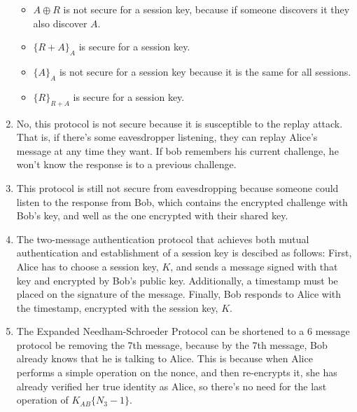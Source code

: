 \documentclass[11pt]{article}
\begin{document}
\begin{enumerate}
\begin{itemize}

\item $A \oplus R$ is not secure for a session key, because if someone discovers it they also discover $A$.  

\item $\{ R + A \}_A$ is secure for a session key.  

\item $\{ A \}_A$ is not secure for a session key because it is the same for all sessions.  

\item $\{ R \}_{R + A}$ is secure for a session key.  

\end{itemize}

\item 

No, this protocol is not secure because it is susceptible to the replay attack.  That is, if there's some eavesdropper listening, they can replay Alice's message at any time they want.  If bob remembers his current challenge, he won't know the response is to a previous challenge.  

\item 

This protocol is still not secure from eavesdropping because someone could listen to the response from Bob, which contains the encrypted challenge with Bob's key, and well as the one encrypted with their shared key.  

\item 

The two-message authentication protocol that achieves both mutual authentication and establishment of a session key is descibed as follows:
First, Alice has to choose a session key, $K$, and sends a message signed with that key and encrypted by Bob's public key.  Additionally, a timestamp must be placed on the signature of the message.  Finally, Bob responds to Alice with the timestamp, encrypted with the session key, $K$.  

\item 

The Expanded Needham-Schroeder Protocol can be shortened to a 6 message protocol be removing the 7th message, because by the 7th message, Bob already knows that he is talking to Alice.  This is because when Alice performs a simple operation on the nonce, and then re-encrypts it, she has already verified her true identity as Alice, so there's no need for the last operation of $K_{AB}\{N_3-1\}$.  


\end{enumerate}
\end{document}
